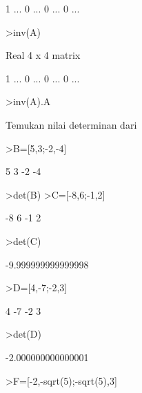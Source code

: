 \documentclass[a4paper,10pt]{article}
\begin{document}
\begin{eulernotebook}
\begin{eulercomment}
\begin{eulercomment}
\begin{eulercomment}
\begin{eulercomment}
\begin{eulercomment}
\begin{eulercomment}
\begin{euleroutput}
                        1     ...
                        0     ...
                        0     ...
                        0     ...
\end{euleroutput}
\begin{eulerprompt}
>inv(A)
\end{eulerprompt}
\begin{euleroutput}
  Real 4 x 4 matrix
  
                        1     ...
                        0     ...
                        0     ...
                        0     ...
\end{euleroutput}
\begin{eulerprompt}
>inv(A).A 
\end{eulerprompt}
\begin{eulercomment}
Temukan nilai determinan dari
\end{eulercomment}
\begin{eulerprompt}
>B=[5,3;-2,-4]
\end{eulerprompt}
\begin{euleroutput}
                        5                       3 
                       -2                      -4 
\end{euleroutput}
\begin{eulerprompt}
>det(B)
>C=[-8,6;-1,2]
\end{eulerprompt}
\begin{euleroutput}
                       -8                       6 
                       -1                       2 
\end{euleroutput}
\begin{eulerprompt}
>det(C)
\end{eulerprompt}
\begin{euleroutput}
  -9.999999999999998
\end{euleroutput}
\begin{eulerprompt}
>D=[4,-7;-2,3]
\end{eulerprompt}
\begin{euleroutput}
                        4                      -7 
                       -2                       3 
\end{euleroutput}
\begin{eulerprompt}
>det(D)
\end{eulerprompt}
\begin{euleroutput}
  -2.000000000000001
\end{euleroutput}
\begin{eulerprompt}
>F=[-2,-sqrt(5);-sqrt(5),3]

\end{eulerprompt}
\end{eulercomment}
\end{eulercomment}
\end{eulercomment}
\end{eulercomment}
\end{eulercomment}
\end{eulercomment}
\end{eulernotebook}
\end{document}
